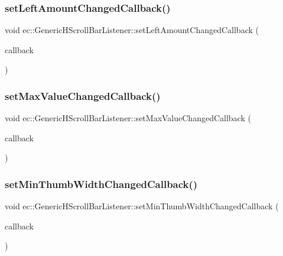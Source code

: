 \subsubsection{\texorpdfstring{set\+Left\+Amount\+Changed\+Callback()}{setLeftAmountChangedCallback()}}
{\footnotesize\ttfamily void ec\+::\+Generic\+H\+Scroll\+Bar\+Listener\+::set\+Left\+Amount\+Changed\+Callback (\begin{DoxyParamCaption}\item[{const \mbox{\hyperlink{classec_1_1_generic_h_scroll_bar_listener_ab6d93e64747e807550ab74972a06a608}{Left\+Amount\+Changed\+\_\+\+Callback}} \&}]{callback }\end{DoxyParamCaption})}

\mbox{\label{classec_1_1_generic_h_scroll_bar_listener_aee47b44914dfb3c8a7f00dec14392030}} 
\subsubsection{\texorpdfstring{set\+Max\+Value\+Changed\+Callback()}{setMaxValueChangedCallback()}}
{\footnotesize\ttfamily void ec\+::\+Generic\+H\+Scroll\+Bar\+Listener\+::set\+Max\+Value\+Changed\+Callback (\begin{DoxyParamCaption}\item[{const \mbox{\hyperlink{classec_1_1_generic_h_scroll_bar_listener_a477535313b5feb1040874b1c0c9c9d1f}{Max\+Value\+Changed\+\_\+\+Callback}} \&}]{callback }\end{DoxyParamCaption})}

\mbox{\label{classec_1_1_generic_h_scroll_bar_listener_a3861dfbf1438257ac974b128528e5bd5}} 
\subsubsection{\texorpdfstring{set\+Min\+Thumb\+Width\+Changed\+Callback()}{setMinThumbWidthChangedCallback()}}
{\footnotesize\ttfamily void ec\+::\+Generic\+H\+Scroll\+Bar\+Listener\+::set\+Min\+Thumb\+Width\+Changed\+Callback (\begin{DoxyParamCaption}\item[{const \mbox{\hyperlink{classec_1_1_generic_h_scroll_bar_listener_a3bfa95b52b5ce492d638cef95b830227}{Min\+Thumb\+Width\+Changed\+\_\+\+Callback}} \&}]{callback }\end{DoxyParamCaption})}

